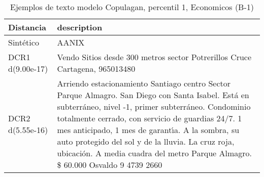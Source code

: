 \begin{table}[H]
\centering
\fontsize{10}{14}\selectfont
\caption{Ejemplos de texto modelo Copulagan, percentil 1, Economicos (B-1)}
\label{table-example-economicos-b-1-copulagan-1p-text}
\begin{tabular}{|l|m{35em}|}
\hline
\rowcolor[gray]{0.8}
Distancia & description \\
\hline Sintético & AANIX \\
\hline DCR1 d(9.00e-17) & Vendo Sitios desde 300 metros sector Potrerillos Cruce Cartagena, 965013480 \\
\hline DCR2 d(5.55e-16) & Arriendo estacionamiento Santiago centro Sector Parque Almagro.
San Diego con Santa Isabel.
Est\'a en subterr\'aneo, nivel -1, primer subterr\'aneo.
Condominio totalmente cerrado, con servicio de guardias 24/7.
1 mes anticipado, 1 mes de garant{\'\i}a.
A la sombra, su auto protegido del sol y de la lluvia.
La cruz roja, ubicaci\'on.
A media cuadra del metro Parque Almagro.
\$ 60.000
Osvaldo
9 4739 2660
 \\
\hline
\end{tabular}
\end{table}

